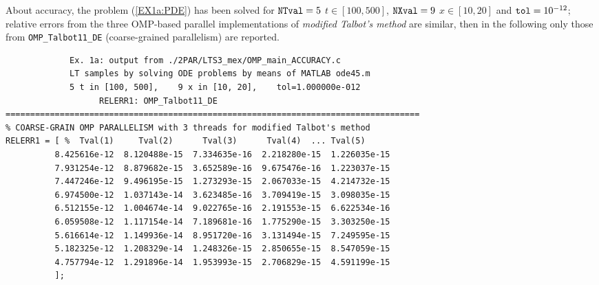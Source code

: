 \documentclass[a4paper,10pt]{report}%
\begin{document}
About accuracy, the problem (\ref{EX1a:PDE}) has been solved for ${\tt NTval}=5$ $t\in[100, 500]$, ${\tt NXval}=9$
$x\in[10,20]$ and ${\tt tol}=10^{-12}$; relative errors from the three OMP-based parallel implementations of
{\em modified Talbot's method} are similar, then in the following only those from {\tt OMP\_Talbot11\_DE}
(coarse-grained parallelism) are reported.
\begin{lstlisting}
             Ex. 1a: output from ./2PAR/LTS3_mex/OMP_main_ACCURACY.c
             LT samples by solving ODE problems by means of MATLAB ode45.m
             5 t in [100, 500],    9 x in [10, 20],    tol=1.000000e-012
                   RELERR1: OMP_Talbot11_DE
====================================================================================
% COARSE-GRAIN OMP PARALLELISM with 3 threads for modified Talbot's method
RELERR1 = [ %  Tval(1)     Tval(2)      Tval(3)      Tval(4)  ... Tval(5)
          8.425616e-12  8.120488e-15  7.334635e-16  2.218280e-15  1.226035e-15
          7.931254e-12  8.879682e-15  3.652589e-16  9.675476e-16  1.223037e-15
          7.447246e-12  9.496195e-15  1.273293e-15  2.067033e-15  4.214732e-15
          6.974500e-12  1.037143e-14  3.623485e-16  3.709419e-15  3.098035e-15
          6.512155e-12  1.004674e-14  9.022765e-16  2.191553e-15  6.622534e-16
          6.059508e-12  1.117154e-14  7.189681e-16  1.775290e-15  3.303250e-15
          5.616614e-12  1.149936e-14  8.951720e-16  3.131494e-15  7.249595e-15
          5.182325e-12  1.208329e-14  1.248326e-15  2.850655e-15  8.547059e-15
          4.757794e-12  1.291896e-14  1.953993e-15  2.706829e-15  4.591199e-15
          ];
\end{lstlisting}
\end{document}
